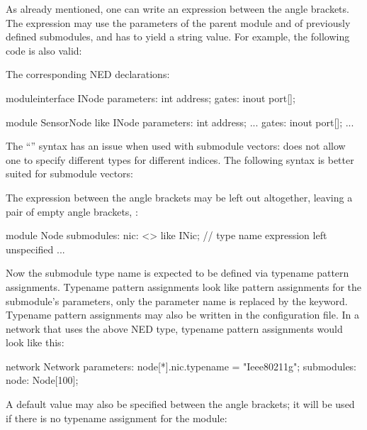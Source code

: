 As already mentioned, one can write an expression between the angle
brackets. The expression may use the parameters of the parent module and of
previously defined submodules, and has to yield a string value. For
example, the following code is also valid:

\begin{ned}
network Net6
{
    parameters:
        string nodeTypePrefix;
        int variant;
    submodules:
        node[6]: <nodeTypePrefix + "Node" + string(variant)> like INode {
           ...
}
\end{ned}

The corresponding NED declarations:

\begin{ned}
moduleinterface INode
{
    parameters:
        int address;
    gates:
        inout port[];
}

module SensorNode like INode
{
    parameters:
        int address;
        ...
    gates:
        inout port[];
        ...
}
\end{ned}

The ``'' syntax has an issue when used
with submodule vectors: does not allow one to specify different types
for different indices. The following syntax is better suited for
submodule vectors:

The expression between the angle brackets may be left out altogether,
leaving a pair of empty angle brackets, \ttt{<>}:

\begin{ned}
module Node
{
    submodules:
        nic: <> like INic;  // type name expression left unspecified
        ...
}
\end{ned}

Now the submodule type name is expected to be defined via typename pattern
assignments. Typename pattern assignments look like pattern assignments for
the submodule's parameters, only the parameter name is replaced by the
 keyword. Typename pattern assignments may also be
written in the configuration file. In a network that uses the above
 NED type, typename pattern assignments would look like this:

\begin{ned}
network Network
{
    parameters:
        node[*].nic.typename = "Ieee80211g";
    submodules:
        node: Node[100];
}
\end{ned}

A default value may also be specified between the angle brackets;
it will be used if there is no typename assignment for the
module:

